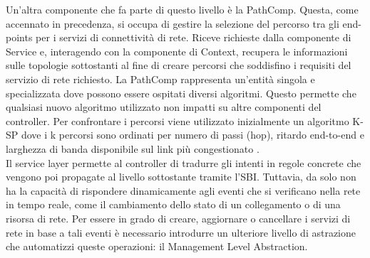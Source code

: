 Un'altra componente che fa parte di questo livello è la PathComp. Questa, come accennato in precedenza, si occupa di gestire la selezione del percorso tra gli end-points per i servizi di connettività di rete. 
Riceve richieste dalla componente di Service e, interagendo con la componente di Context, recupera le informazioni sulle topologie sottostanti al fine di creare
percorsi che soddisfino i requisiti del servizio di rete richiesto.
La PathComp rappresenta un'entità singola e specializzata dove possono essere ospitati diversi algoritmi. Questo permette che qualsiasi nuovo algoritmo utilizzato non impatti su altre componenti del controller.
Per confrontare i percorsi viene utilizzato inizialmente un algoritmo K-SP dove i k percorsi sono ordinati per numero di passi (hop), ritardo end-to-end e larghezza di banda disponibile sul link più congestionato \cite{D53}. 
\\Il service layer permette al controller di tradurre gli intenti in regole concrete che vengono poi propagate al livello sottostante tramite l'SBI.
Tuttavia, da solo non ha la capacità di rispondere dinamicamente agli eventi che si verificano nella rete in tempo reale, come il cambiamento dello stato di un collegamento o di una risorsa di rete. %
Per essere in grado di creare, aggiornare o cancellare i servizi di rete in base a tali eventi è necessario introdurre un ulteriore livello di astrazione che automatizzi queste operazioni: il Management Level Abstraction.


